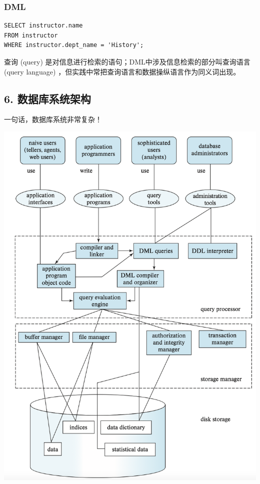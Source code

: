\documentclass[aspectratio=169, 14pt]{beamer}
\begin{document}
\begin{frame}[fragile]
    \frametitle{DML}
    \begin{verbatim}
SELECT instructor.name
FROM instructor
WHERE instructor.dept_name = 'History';   
    \end{verbatim} 
    查询 (query) 是对信息进行检索的语句；DML中涉及信息检索的部分叫\alert{查询语言 (query language)} ，但实践中常把查询语言和数据操纵语言作为同义词出现。
\end{frame}

\begin{frame}
    \section{\textcolor{darkmidnightblue}{6. 数据库系统架构}}  
    一句话，数据库系统非常复杂！
\end{frame}

\begin{frame}
    \begin{center}
        \includegraphics[height=.95\paperheight]{DBMS}
    \end{center}

    

\end{frame}
\end{document}
